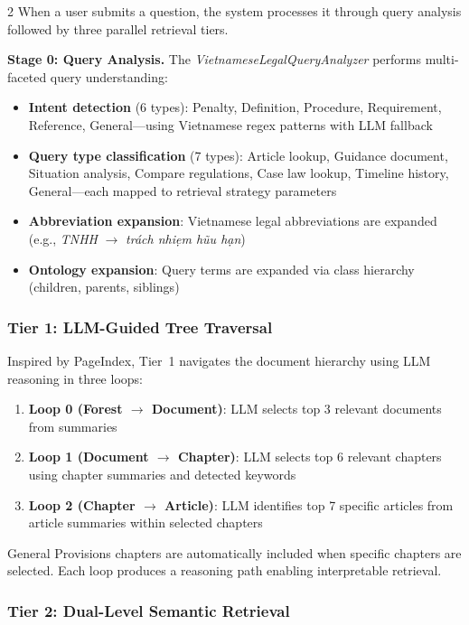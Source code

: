 \documentclass[11pt,a4paper]{article}
\begin{document}
\begin{multicols}{2}
When a user submits a question, the system processes it through query analysis followed by three parallel retrieval tiers.

\textbf{Stage 0: Query Analysis.} The \textit{VietnameseLegalQueryAnalyzer} performs multi-faceted query understanding:
\begin{itemize}
\item \textbf{Intent detection} (6 types): Penalty, Definition, Procedure, Requirement, Reference, General---using Vietnamese regex patterns with LLM fallback
\item \textbf{Query type classification} (7 types): Article lookup, Guidance document, Situation analysis, Compare regulations, Case law lookup, Timeline history, General---each mapped to retrieval strategy parameters
\item \textbf{Abbreviation expansion}: Vietnamese legal abbreviations are expanded (e.g., \textit{TNHH} $\rightarrow$ \textit{tr\'ach nhi\d{e}m h\~{u}u h\d{a}n})
\item \textbf{Ontology expansion}: Query terms are expanded via class hierarchy (children, parents, siblings)
\end{itemize}

\subsubsection{Tier 1: LLM-Guided Tree Traversal}

Inspired by PageIndex, Tier~1 navigates the document hierarchy using LLM reasoning in three loops:

\begin{enumerate}
\item \textbf{Loop 0 (Forest $\rightarrow$ Document)}: LLM selects top 3 relevant documents from summaries
\item \textbf{Loop 1 (Document $\rightarrow$ Chapter)}: LLM selects top 6 relevant chapters using chapter summaries and detected keywords
\item \textbf{Loop 2 (Chapter $\rightarrow$ Article)}: LLM identifies top 7 specific articles from article summaries within selected chapters
\end{enumerate}

General Provisions chapters are automatically included when specific chapters are selected. Each loop produces a reasoning path enabling interpretable retrieval.

\subsubsection{Tier 2: Dual-Level Semantic Retrieval}


\end{multicols}
\end{document}
